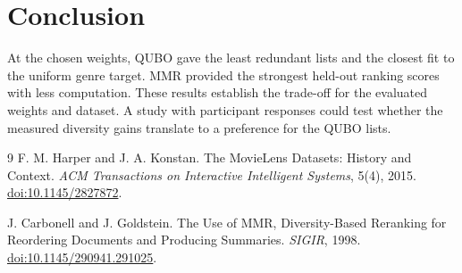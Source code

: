 \documentclass[10pt,a4paper]{article}
\begin{document}
\section{Conclusion}
At the chosen weights, QUBO gave the least redundant lists and the closest fit to the uniform genre target. MMR provided the strongest held-out ranking scores with less computation. These results establish the trade-off for the evaluated weights and dataset. A study with participant responses could test whether the measured diversity gains translate to a preference for the QUBO lists.

\begin{thebibliography}{9}
\small
{}
F. M. Harper and J. A. Konstan. The MovieLens Datasets: History and Context. \emph{ACM Transactions on Interactive Intelligent Systems}, 5(4), 2015. \href{https://doi.org/10.1145/2827872}{doi:10.1145/2827872}.

J. Carbonell and J. Goldstein. The Use of MMR, Diversity-Based Reranking for Reordering Documents and Producing Summaries. \emph{SIGIR}, 1998. \href{https://doi.org/10.1145/290941.291025}{doi:10.1145/290941.291025}.
\end{thebibliography}
\end{document}
